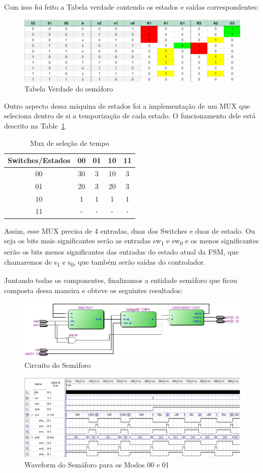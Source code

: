 Com isso foi feito a Tabela verdade contendo os estados e saídas correspondentes:
\begin{figure}
\caption{Tabela Verdade do semáforo}
\centering
\includegraphics[width=0.75\columnwidth]{tv_semaforo.png}
\end{figure}

Outro aspecto dessa máquina de estados foi a implementação de um MUX que seleciona dentro de si a temporização de cada estado. O funcionamento dele está descrito na Table~\ref{tab01}.
\begin{table}[]
\caption{Mux de seleção de tempo}
\label{tab01}
\begin{tabular}{| c | c | c | c | c |}
\hline
Switches/Estados & 00 & 01 & 10 & 11  \\ \hline
00  & 30 & 3 & 10 & 3 \\ 
01  & 20 & 3 & 20 & 3 \\ 
10  & 1  & 1 & 1  & 1 \\ 
11  & -  & - & -  & - \\ \hline
\end{tabular}
\end{table}
Assim, esse MUX precisa de 4 entradas, duas dos Switches e duas de estado. Ou seja os bits mais significantes serão as entradas sw\textsubscript{1} e sw\textsubscript{0} e os menos significantes serão os bits menos significantes das entradas do estado atual da FSM, que chamaremos de s\textsubscript{1} e s\textsubscript{0}, que também serão saídas do controlador.

Juntando todas os componentes, finalizamos a entidade semáforo que ficou composta dessa maneira e obteve os seguintes resultados:
\begin{figure}
\caption{Circuito do Semáforo}
\centering
\includegraphics[width=0.75\columnwidth]{semaforo1.png}
\end{figure}

\begin{figure}
\caption{Waveform do Semáforo para os Modos 00 e 01}
\centering
\includegraphics[width=0.99\columnwidth]{waveformsemaforo.png}
\end{figure}

